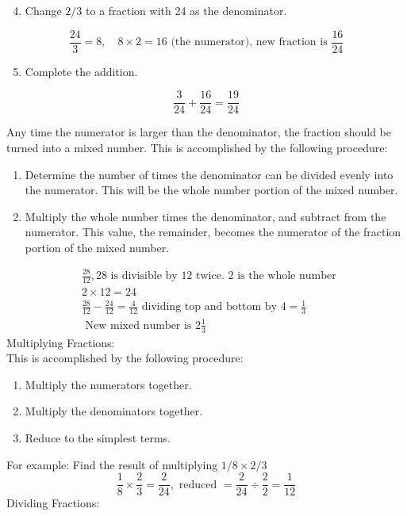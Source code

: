 \begin{enumerate}
  \setcounter{enumi}{3}
  \item Change $2 / 3$ to a fraction with 24 as the denominator.
\end{enumerate}
$$
\frac{24}{3}=8, \quad 8 \times 2=16 \text { (the numerator), new fraction is } \frac{16}{24}
$$

\begin{enumerate}
  \setcounter{enumi}{4}
  \item Complete the addition.
\end{enumerate}
$$
\frac{3}{24}+\frac{16}{24}=\frac{19}{24}
$$


Any time the numerator is larger than the denominator, the fraction should be turned into a mixed number. This is accomplished by the following procedure:

\begin{enumerate}
  \item Determine the number of times the denominator can be divided evenly into the numerator. This will be the whole number portion of the mixed number.

  \item Multiply the whole number times the denominator, and subtract from the numerator. This value, the remainder, becomes the numerator of the fraction portion of the mixed number.

\end{enumerate}
$$
\begin{aligned}
&\frac{28}{12}, 28 \text { is divisible by } 12 \text { twice. } 2 \text { is the whole number } \\
&2 \times 12=24 \\
&\frac{28}{12}-\frac{24}{12}=\frac{4}{12} \text { dividing top and bottom by } 4=\frac{1}{3} \\
&\text { New mixed number is } 2 \frac{1}{3}
\end{aligned}
$$
Multiplying Fractions:\\

This is accomplished by the following procedure:

\begin{enumerate}
  \item Multiply the numerators together.

  \item Multiply the denominators together.

  \item Reduce to the simplest terms.

\end{enumerate}
For example: Find the result of multiplying $1 / 8 \times 2 / 3$
$$
\frac{1}{8} \times \frac{2}{3}=\frac{2}{24}, \text { reduced }=\frac{2}{24} \div \frac{2}{2}=\frac{1}{12}
$$
Dividing Fractions:\\

